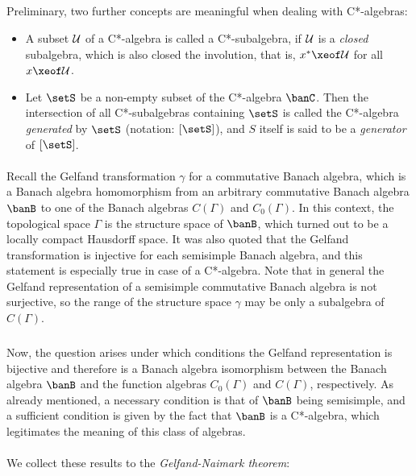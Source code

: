 \documentclass[11pt,twoside]{article}
\begin{document}
\subparagraph{} %
Preliminary,
two further concepts are meaningful when dealing with C*-algebras:

\begin{itemize}[leftmargin=12pt]
\item[1.]
A subset $\cal{U}$ of a C*-algebra is called a C*-subalgebra,
if $\cal{U}$ is a \textit{closed} subalgebra,
which is also closed {\wrt} the involution,
that is,
$x^* \xeof \cal{U}$ for all $x \xeof \cal{U}$.

\item[2.]
Let $\setS$ be a non-empty subset of the C*-algebra $\banC$.
Then the intersection of all C*-subalgebras containing $\setS$
is called the C*-algebra \textit{generated} by $\setS$ (notation: $[\setS]$),
and $S$ itself is said to be a \textit{generator} of $[\setS]$.
\end{itemize}

\paragraph{} %
Recall the Gelfand transformation $\gamma$ for a commutative Banach algebra,
which is a Banach algebra homomorphism from an arbitrary commutative
Banach algebra $\banB$ to one of the Banach algebras $C(\Gamma)$
and $C_0(\Gamma)$.
In this context, the topological space $\Gamma$
is the structure space of $\banB$,
which turned out to be a locally compact Hausdorff space.
It was also quoted
that the Gelfand transformation is injective for each semisimple Banach algebra,
and this statement is especially true in case of a C*-algebra.
Note
that in general the Gelfand representation
of a semisimple commutative Banach algebra is not surjective,
so the range of the structure space $\gamma$ may be
only a subalgebra of $C(\Gamma)$.

\subparagraph{}
Now,
the question arises
under which conditions the Gelfand representation is bijective
and therefore is a Banach algebra isomorphism
between the Banach algebra $\banB$ and the function algebras 
$C_0(\Gamma)$ and $C(\Gamma)$, respectively.
As already mentioned,
a necessary condition is that of $\banB$ being semisimple,
and a sufficient condition is given by the fact
that $\banB$ is a C*-algebra,
which legitimates the meaning of this class of algebras.

\paragraph{} %
We collect these results to the \textit{Gelfand-Naimark theorem}:
\end{document}
